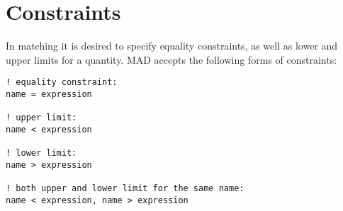 
\section{Constraints}

In matching it is desired to specify equality constraints, as well as
lower and upper limits for a quantity. MAD accepts the following forms
of constraints:  
\begin{verbatim}
! equality constraint:
name = expression

! upper limit:
name < expression

! lower limit:
name > expression

! both upper and lower limit for the same name:
name < expression, name > expression
\end{verbatim}




